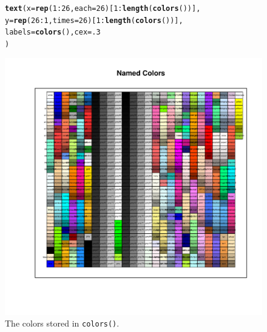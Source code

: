 \documentclass{tufte-book}\usepackage[]{graphicx}\usepackage[]{color}
\makeatletter
\def\maxwidth{ %
  \ifdim\Gin@nat@width>\linewidth
    \linewidth
  \else
    \Gin@nat@width
  \fi
}
\newcommand{\hlnum}[1]{\textcolor[rgb]{0.686,0.059,0.569}{#1}}%
\newcommand{\hlopt}[1]{\textcolor[rgb]{0,0,0}{#1}}%
\newcommand{\hlstd}[1]{\textcolor[rgb]{0.345,0.345,0.345}{#1}}%
\newcommand{\hlkwc}[1]{\textcolor[rgb]{0.333,0.667,0.333}{#1}}%
\newcommand{\hlkwd}[1]{\textcolor[rgb]{0.737,0.353,0.396}{\textbf{#1}}}%
\newenvironment{kframe}{%
 \def\at@end@of@kframe{}%
 \ifinner\ifhmode%
  \def\at@end@of@kframe{\end{minipage}}%
  \begin{minipage}{\columnwidth}%
 \fi\fi%
 \def\FrameCommand##1{\hskip\@totalleftmargin \hskip-\fboxsep
 \colorbox{shadecolor}{##1}\hskip-\fboxsep
     \hskip-\linewidth \hskip-\@totalleftmargin \hskip\columnwidth}%
 \MakeFramed {\advance\hsize-\width
   \@totalleftmargin\z@ \linewidth\hsize
   \@setminipage}}%
 {\par\unskip\endMakeFramed%
 \at@end@of@kframe}
\newenvironment{knitrout}{}{} %
\makeatother
\begin{document}
\begin{figure}[h]
\begin{footnotesize}
\begin{knitrout}
\begin{kframe}
\begin{alltt}
\hlkwd{text}\hlstd{(}\hlkwc{x} \hlstd{=} \hlkwd{rep}\hlstd{(}\hlnum{1}\hlopt{:}\hlnum{26}\hlstd{,} \hlkwc{each} \hlstd{=} \hlnum{26}\hlstd{)[}\hlnum{1}\hlopt{:}\hlkwd{length}\hlstd{(}\hlkwd{colors}\hlstd{())],}
     \hlkwc{y} \hlstd{=} \hlkwd{rep}\hlstd{(}\hlnum{26}\hlopt{:}\hlnum{1}\hlstd{,} \hlkwc{times} \hlstd{=} \hlnum{26}\hlstd{)[}\hlnum{1}\hlopt{:}\hlkwd{length}\hlstd{(}\hlkwd{colors}\hlstd{())],}
     \hlkwc{labels} \hlstd{=} \hlkwd{colors}\hlstd{(),} \hlkwc{cex} \hlstd{=} \hlnum{.3}
     \hlstd{)}
\end{alltt}
\end{kframe}
\includegraphics[width=\maxwidth]{figure/unnamed-chunk-390-1} 

\end{knitrout}
\end{footnotesize}
\caption{The colors stored in \texttt{colors()}.}
\label{fig:colors}
\end{figure}



\backmatter




\printindex %
\end{document}
